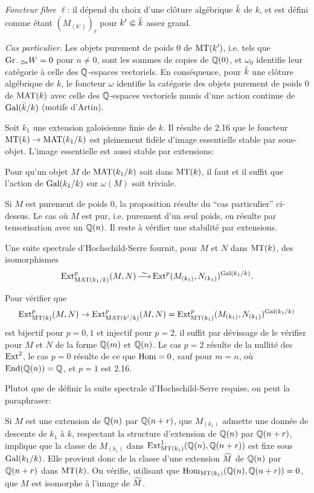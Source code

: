\medskip\noindent
{\it Foncteur fibre $\ell$}:
il d\'epend du choix d'une cl\^{o}ture
alg\'ebrique $\bar{k}$ de $k$, et est d\'efini
comme \'etant $(M_{(k')})_\ell$ pour
$k'\Subset\bar{k}$ assez grand. 

\medskip\noindent
{\it Cas particulier.}
Les objets purement de poids $0$ de $\text{\rm MT}(k')$,
i.e. tels que $\text{\rm Gr}_{-2n}W=0$ pour $n\not=0$,
sont les sommes de copies de ${\Bbb Q}(0)$, et
$\omega_0$ identifie leur cat\'egorie \`a
celle des ${\Bbb Q}$-espaces vectoriels.
En cons\'equence, pour $\bar{k}$ une cl\^{o}ture
alg\'ebrique de $k$, le foncteur $\omega$
identifie la cat\'egorie des objets purement
de poids $0$ de $\text{\rm MAT}(k)$ avec celle des
${\Bbb Q}$-espaces vectoriels munis d'une action
continue de $\text{\rm Gal}(\bar{k}/k)$ (motifs d'Artin).

Soit $k_1$ une extension galoisienne finie de
$k$.
Il r\'esulte de 2.16 que le foncteur $\text{\rm MT}(k)\to
\text{\rm MAT}(k_1/k)$ est pleinement fid\`ele d'image
essentielle stable par sous-objet.
L'image essentielle est aussi stable par
extensions:

Pour qu'un objet $M$ de $\text{\rm MAT}(k_1/k)$ soit dans
$\text{\rm MT}(k)$, il faut et il suffit que l'action de
$\text{\rm Gal}(k_1/k)$ sur $\omega(M)$ soit triviale.
\endproclaim

Si $M$ est purement de poids $0$, la
proposition r\'esulte du ``cas particulier''
ci-dessus.
Le cas o\`u $M$ est pur, i.e. purement d'un
seul poids, en r\'esulte par tensorisation avec
un ${\Bbb Q}(n)$.
Il reste \`a v\'erifier une stabilit\'e par
extensions.

Une suite spectrale d'Hochschild-Serre
fournit, pour $M$ et $N$ dans $\text{\rm MT}(k)$, des
isomorphismes
$$
\Ext_{\MAT(k_1/k)}^p(M,N)\simover \Ext^p
(M_{(k_1)},N_{(k_1)})^{\Gal(k_1/k)}.
$$

Pour v\'erifier que
$$
\text{\rm Ext}_{\text{\rm MT}(k)}^p(M,N)\to\text{\rm Ext}_{\text{\rm MAT}(k'/k)}^p
(M,N)=\text{\rm Ext}_{\text{\rm MT}(k_1)}^p(M_{(k_1)},
N_{(k_1)})^{\text{\rm Gal}(k_1/k)}
$$
est bijectif pour $p=0,1$ et injectif pour
$p=2$, il suffit par d\'evissage de le
v\'erifier pour $M$ et $N$ de la forme
${\Bbb Q}(m)$ et ${\Bbb Q}(n)$.
Le cas $p=2$ r\'esulte de la nullit\'e des
$\text{\rm Ext}^2$, le cas $p=0$ r\'esulte de ce que
$\text{\rm Hom}=0$, sauf pour $m=n$, o\`u
$\text{\rm End}({\Bbb Q}(n))={\Bbb Q}$, et $p=1$ est 2.16.
\enddemo

Plutot que de d\'efinir la suite spectrale
d'Hochschild-Serre requise, on peut la
paraphraser:

Si $M$ est une extension de ${\Bbb Q}(n)$ par
${\Bbb Q}(n+r)$, que $M_{(k_1)}$ admette une
donn\'ee de descente de $k_1$ \`a $k$,
respectant la structure d'extension de
${\Bbb Q}(n)$ par ${\Bbb Q}(n+r)$, implique que la
classe de $M_{(k_1)}$ dans
$\text{\rm Ext}_{\text{\rm MT}(k_1)}^1({\Bbb Q}(n),{\Bbb Q}(n+r))$ est fixe
sous $\text{\rm Gal}(k_1/k)$.
Elle provient donc de la classe d'une
extension $\widetilde{M}$ de ${\Bbb Q}(n)$ par
${\Bbb Q}(n+r)$ dans $\text{\rm MT}(k)$.
On v\'erifie, utilisant que
$\text{\rm Hom}_{\text{\rm MT}(k_1)}({\Bbb Q}(n),{\Bbb Q}(n+r))=0$, que $M$
est isomorphe \`a l'image de $\widetilde{M}$.

